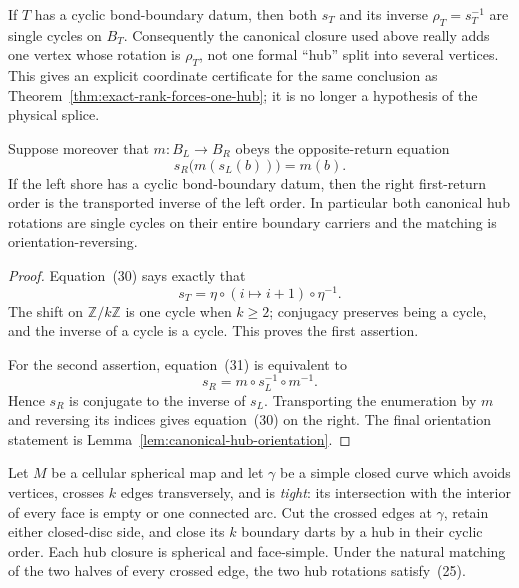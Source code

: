 \begin{lemma}
\label{lem:cyclic-bond-one-hub}
If \(T\) has a cyclic bond-boundary datum, then both \(s_T\) and its inverse
\(\rho_T=s_T^{-1}\) are single cycles on \(B_T\).  Consequently the
canonical closure used above really adds one vertex whose rotation is
\(\rho_T\), not one formal ``hub'' split into several vertices.  This gives
an explicit coordinate certificate for the same conclusion as
Theorem~\ref{thm:exact-rank-forces-one-hub}; it is no longer a hypothesis of
the physical splice.

Suppose moreover that \(m:B_L\to B_R\) obeys the opposite-return equation
\[
       s_R\bigl(m(s_L(b))\bigr)=m(b).                \tag{31}
\]
If the left shore has a cyclic bond-boundary datum, then the right
first-return order is the transported inverse of the left order.  In
particular both canonical hub rotations are single cycles on their entire
boundary carriers and the matching is orientation-reversing.
\end{lemma}

\begin{proof}
Equation~(30) says exactly that
\[
       s_T=\eta\circ(i\mapsto i+1)\circ\eta^{-1}.
\]
The shift on \(\mathbb Z/k\mathbb Z\) is one cycle when \(k\ge2\); conjugacy
preserves being a cycle, and the inverse of a cycle is a cycle.  This proves
the first assertion.

For the second assertion, equation~(31) is equivalent to
\[
       s_R=m\circ s_L^{-1}\circ m^{-1}.
\]
Hence \(s_R\) is conjugate to the inverse of \(s_L\).  Transporting the
enumeration by \(m\) and reversing its indices gives equation~(30) on the
right.  The final orientation statement is
Lemma~\ref{lem:canonical-hub-orientation}.
\end{proof}

\begin{lemma}
\label{lem:tight-noose-cap-data}
\Sprose
Let \(M\) be a cellular spherical map and let \(\gamma\) be a simple closed
curve which avoids vertices, crosses \(k\) edges transversely, and is
\emph{tight}: its intersection with the interior of every face is empty or
one connected arc.  Cut the crossed edges at \(\gamma\), retain either
closed-disc side, and close its \(k\) boundary darts by a hub in their cyclic
order.  Each hub closure is spherical and face-simple.  Under the natural
matching of the two halves of every crossed edge, the two hub rotations
satisfy~(25).
\end{lemma}

